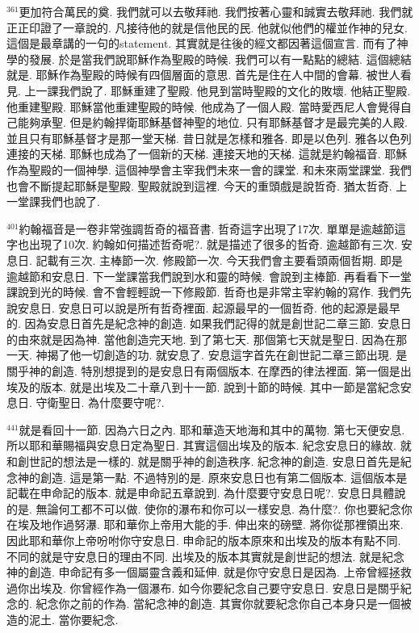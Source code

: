 \documentclass{book}
\begin{document}
$^{361}$更加符合萬民的奠.
我們就可以去敬拜祂.
我們按著心靈和誠實去敬拜祂.
我們就正正印證了一章說的.
凡接待他的就是信他民的民.
他就似他們的權並作神的兒女.
這個是最章講的一句的statement.
其實就是往後的經文都因著這個宣言.
而有了神學的發展.
於是當我們說耶穌作為聖殿的時候.
我們可以有一點點的總結.
這個總結就是.
耶穌作為聖殿的時候有四個層面的意思.
首先是住在人中間的會幕.
被世人看見.
上一課我們說了.
耶穌重建了聖殿.
他見到當時聖殿的文化的敗壞.
他結正聖殿.
他重建聖殿.
耶穌當他重建聖殿的時候.
他成為了一個人殿.
當時愛西尼人會覺得自己能夠承聖.
但是約翰捍衛耶穌基督神聖的地位.
只有耶穌基督才是最完美的人殿.
並且只有耶穌基督才是那一堂天梯.
昔日就是怎樣和雅各.
即是以色列.
雅各以色列連接的天梯.
耶穌也成為了一個新的天梯.
連接天地的天梯.
這就是約翰福音.
耶穌作為聖殿的一個神學.
這個神學會主宰我們未來一會的課堂.
和未來兩堂課堂.
我們也會不斷提起耶穌是聖殿.
聖殿就說到這裡.
今天的重頭戲是說哲奇.
猶太哲奇.
上一堂課我們也說了.

$^{401}$約翰福音是一卷非常強調哲奇的福音書.
哲奇這字出現了17次.
單單是逾越節這字也出現了10次.
約翰如何描述哲奇呢?.
就是描述了很多的哲奇.
逾越節有三次.
安息日.
記載有三次.
主棒節一次.
修殿節一次.
今天我們會主要看頭兩個哲期.
即是逾越節和安息日.
下一堂課當我們說到水和靈的時候.
會說到主棒節.
再看看下一堂課說到光的時候.
會不會輕輕說一下修殿節.
哲奇也是非常主宰約翰的寫作.
我們先說安息日.
安息日可以說是所有哲奇裡面.
起源最早的一個哲奇.
他的起源是最早的.
因為安息日首先是紀念神的創造.
如果我們記得的就是創世記二章三節.
安息日的由來就是因為神.
當他創造完天地.
到了第七天.
那個第七天就是聖日.
因為在那一天.
神揭了他一切創造的功.
就安息了.
安息這字首先在創世記二章三節出現.
是關乎神的創造.
特別想提到的是安息日有兩個版本.
在摩西的律法裡面.
第一個是出埃及的版本.
就是出埃及二十章八到十一節.
說到十節的時候.
其中一節是當紀念安息日.
守衛聖日.
為什麼要守呢?.

$^{441}$就是看回十一節.
因為六日之內.
耶和華造天地海和其中的萬物.
第七天便安息.
所以耶和華賜福與安息日定為聖日.
其實這個出埃及的版本.
紀念安息日的緣故.
就和創世記的想法是一樣的.
就是關乎神的創造秩序.
紀念神的創造.
安息日首先是紀念神的創造.
這是第一點.
不過特別的是.
原來安息日也有第二個版本.
這個版本是記載在申命記的版本.
就是申命記五章說到.
為什麼要守安息日呢?.
安息日具體說的是.
無論何工都不可以做.
使你的瀑布和你可以一樣安息.
為什麼?.
你也要紀念你在埃及地作過努瀑.
耶和華你上帝用大能的手.
伸出來的磅壁.
將你從那裡領出來.
因此耶和華你上帝吩咐你守安息日.
申命記的版本原來和出埃及的版本有點不同.
不同的就是守安息日的理由不同.
出埃及的版本其實就是創世記的想法.
就是紀念神的創造.
申命記有多一個屬靈含義和延伸.
就是你守安息日是因為.
上帝曾經拯救過你出埃及.
你曾經作為一個瀑布.
如今你要紀念自己要守安息日.
安息日是關乎紀念的.
紀念你之前的作為.
當紀念神的創造.
其實你就要紀念你自己本身只是一個被造的泥土.
當你要紀念.
\end{document}
